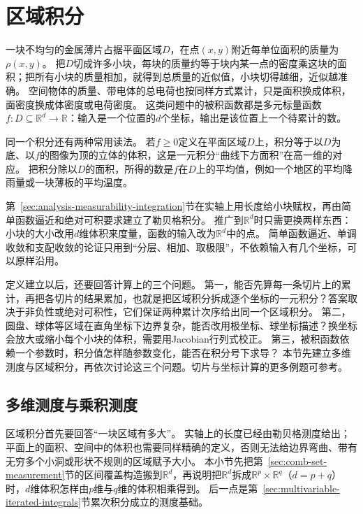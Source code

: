 \section{区域积分}
\label{sec:multivariable-region-integration}

一块不均匀的金属薄片占据平面区域$D$，在点$(x,y)$附近每单位面积的质量为$\rho(x,y)$。
把$D$切成许多小块，每块的质量约等于块内某一点的密度乘这块的面积；把所有小块的质量相加，就得到总质量的近似值，小块切得越细，近似越准确。
空间物体的质量、带电体的总电荷也按同样方式累计，只是面积换成体积，面密度换成体密度或电荷密度。
这类问题中的被积函数都是多元标量函数$f:D\subseteq\mathbb R^d\to\mathbb R$：输入是一个位置的$d$个坐标，输出是该位置上一个待累计的数。

同一个积分还有两种常用读法。
若$f\geq0$定义在平面区域$D$上，积分等于以$D$为底、以$f$的图像为顶的立体的体积，这是一元积分“曲线下方面积”在高一维的对应。
把积分除以$D$的面积，所得的数是$f$在$D$上的平均值，例如一个地区的平均降雨量或一块薄板的平均温度。

第~\ref{sec:analysis-measurability-integration}节在实轴上用长度给小块赋权，再由简单函数逼近和绝对可积要求建立了勒贝格积分。
推广到$\mathbb R^d$时只需更换两样东西：小块的大小改用$d$维体积来度量，函数的输入改为$\mathbb R^d$中的点。
简单函数逼近、单调收敛和支配收敛的论证只用到“分层、相加、取极限”，不依赖输入有几个坐标，可以原样沿用。

定义建立以后，还要回答计算上的三个问题。
第一，能否先算每一条切片上的累计，再把各切片的结果累加，也就是把区域积分拆成逐个坐标的一元积分？答案取决于非负性或绝对可积性，它们保证两种累计次序给出同一个区域积分。
第二，圆盘、球体等区域在直角坐标下边界复杂，能否改用极坐标、球坐标描述？换坐标会放大或缩小每个小块的体积，需要用Jacobian行列式校正。
第三，被积函数依赖一个参数时，积分值怎样随参数变化，能否在积分号下求导？
本节先建立多维测度与区域积分，再依次讨论这三个问题。切片与坐标计算的更多例题可参考。

\subsection{多维测度与乘积测度}
\label{sec:comb-multidimensional-product-measure}

区域积分首先要回答“一块区域有多大”。
实轴上的长度已经由勒贝格测度给出；平面上的面积、空间中的体积也需要同样精确的定义，否则无法给边界弯曲、带有无穷多个小洞或形状不规则的区域赋予大小。
本小节先把第~\ref{sec:comb-set-measurement}节的区间覆盖构造搬到$\mathbb R^d$，再说明把$\mathbb R^d$拆成$\mathbb R^p\times\mathbb R^q$（$d=p+q$）时，$d$维体积怎样由$p$维与$q$维的体积相乘得到。
后一点是第~\ref{sec:multivariable-iterated-integrals}节累次积分成立的测度基础。

